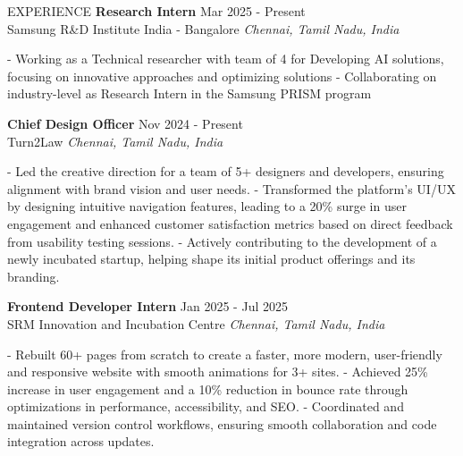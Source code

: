 \documentclass{resume} %
\begin{document}






\begin{rSection}{EXPERIENCE}
    \textbf{Research Intern} \hfill Mar 2025 - Present\\
Samsung R\&D Institute India - Bangalore \hfill \textit{Chennai, Tamil Nadu, India}

- Working as a Technical researcher with team of 4 for Developing AI solutions, focusing on innovative approaches and optimizing solutions
- Collaborating on industry-level as Research Intern in the Samsung PRISM program

\textbf{Chief Design Officer} \hfill Nov 2024 - Present\\
Turn2Law \hfill \textit{Chennai, Tamil Nadu, India}

- Led the creative direction for a team of 5+ designers and developers, ensuring alignment with brand vision and user needs.
-  Transformed the platform’s UI/UX by designing intuitive navigation features, leading to a 20\% surge in user engagement and enhanced customer satisfaction metrics based on direct feedback from usability testing sessions.
- Actively contributing to the development of a newly incubated startup, helping shape its initial product offerings and its branding.

\textbf{Frontend Developer Intern} \hfill Jan 2025 - Jul 2025\\
SRM Innovation and Incubation Centre \hfill \textit{Chennai, Tamil Nadu, India}

- Rebuilt 60+ pages from scratch to create a faster, more modern, user-friendly and responsive website with smooth animations for 3+ sites.
- Achieved 25\% increase in user engagement and a 10\% reduction in bounce rate through optimizations in performance, accessibility, and SEO.
- Coordinated and maintained version control workflows, ensuring smooth collaboration and code integration across updates.


\end{rSection}
\end{document}
